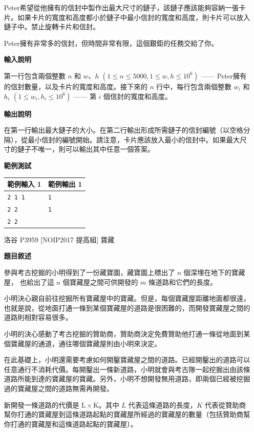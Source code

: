     Peter希望從他擁有的信封中製作出最大尺寸的鏈子，該鏈子應該能夠容納一張卡片。如果卡片的寬度和高度都小於鏈子中最小信封的寬度和高度，則卡片可以放入鏈子中。禁止旋轉卡片和信封。

    Peter擁有非常多的信封，但時間非常有限，這個艱鉅的任務交給了你。

    \textbf{輸入說明}

    第一行包含兩個整數 $n$ 和 $w$、$h$ $(1\leq n\leq 5000, 1\leq w, h\leq 10^6)$ —— Peter擁有的信封數量，以及卡片的寬度和高度。接下來的 $n$ 行中，每行包含兩個整數 $w_i$ 和 $h_i$ $(1\leq w_i, h_i\leq 10^6)$ —— 第 $i$ 個信封的寬度和高度。

    \textbf{輸出說明}

    在第一行輸出最大鏈子的大小。在第二行輸出形成所需鏈子的信封編號（以空格分隔），從最小信封的編號開始。請注意，卡片應該放入最小的信封中。如果最大尺寸的鏈子不唯一，則可以輸出其中任意一個答案。

    \textbf{範例測試}

    \begin{tabular}{|m{7cm}|m{7cm}|}
        \hline
        範例輸入 1 & 範例輸出 1 \\
        \hline
        \verb|2 1 1| & \verb|1| \\
        \verb|2 2| & \verb|1| \\
        \verb|2 2| & \\
        \hline
    \end{tabular}
    
    \problem 洛谷 P3959 [NOIP2017 提高組] 寶藏

    \textbf{題目敘述}

    參與考古挖掘的小明得到了一份藏寶圖，藏寶圖上標出了 $n$ 個深埋在地下的寶藏屋， 也給出了這 $n$ 個寶藏屋之間可供開發的 $m$ 條道路和它們的長度。

    小明決心親自前往挖掘所有寶藏屋中的寶藏。但是，每個寶藏屋距離地面都很遠，也就是說，從地面打通一條到某個寶藏屋的道路是很困難的，而開發寶藏屋之間的道路則相對容易很多。

    小明的決心感動了考古挖掘的贊助商，贊助商決定免費贊助他打通一條從地面到某個寶藏屋的通道，通往哪個寶藏屋則由小明來決定。

    在此基礎上，小明還需要考慮如何開鑿寶藏屋之間的道路。已經開鑿出的道路可以任意通行不消耗代價。每開鑿出一條新道路，小明就會與考古隊一起挖掘出由該條道路所能到達的寶藏屋的寶藏。另外，小明不想開發無用道路，即兩個已經被挖掘過的寶藏屋之間的道路無需再開發。

    新開發一條道路的代價是 $\mathrm{L} \times \mathrm{K}$。其中 $L$ 代表這條道路的長度，$K$ 代表從贊助商幫你打通的寶藏屋到這條道路起點的寶藏屋所經過的寶藏屋的數量（包括贊助商幫你打通的寶藏屋和這條道路起點的寶藏屋）。

